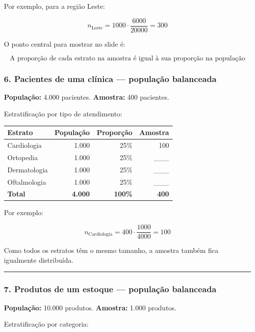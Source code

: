 \documentclass[
]{book}
\begin{document}
Por exemplo, para a região Leste:

\[
n_{\text{Leste}} = 1000\cdot\frac{6000}{20000} = 300
\]

O ponto central para mostrar no slide é:

\[
\boxed{\text{A proporção de cada estrato na amostra é igual à sua proporção na população}}
\]

\subsubsection{6. Pacientes de uma clínica --- população balanceada}\label{pacientes-de-uma-cluxednica-populauxe7uxe3o-balanceada}

\textbf{População:} 4.000 pacientes.
\textbf{Amostra:} 400 pacientes.

Estratificação por tipo de atendimento:

\begin{longtable}[]{@{}lrrr@{}}
\toprule\noalign{}
Estrato & População & Proporção & Amostra \\
\midrule\noalign{}
\endhead
\bottomrule\noalign{}
\endlastfoot
Cardiologia & 1.000 & 25\% & 100 \\
Ortopedia & 1.000 & 25\% & \_\_\_ \\
Dermatologia & 1.000 & 25\% & \_\_\_ \\
Oftalmologia & 1.000 & 25\% & \_\_\_ \\
\textbf{Total} & \textbf{4.000} & \textbf{100\%} & \textbf{400} \\
\end{longtable}

Por exemplo:

\[
n_{\text{Cardiologia}} = 400\cdot\frac{1000}{4000} = 100
\]

Como todos os estratos têm o mesmo tamanho, a amostra também fica igualmente distribuída.

\begin{center}\rule{0.5\linewidth}{0.5pt}\end{center}

\subsubsection{7. Produtos de um estoque --- população balanceada}\label{produtos-de-um-estoque-populauxe7uxe3o-balanceada}

\textbf{População:} 10.000 produtos.
\textbf{Amostra:} 1.000 produtos.

Estratificação por categoria:
\end{document}
